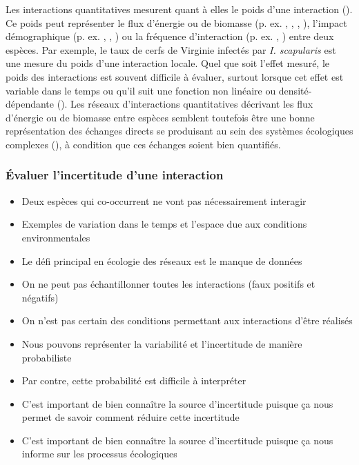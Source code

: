 Les interactions quantitatives mesurent quant à elles le poids d'une interaction
(\cite{Berlow2004Interaction}). Ce poids peut représenter le flux d'énergie ou
de biomasse (p. ex. \cite{Benke2001Food}, \cite{Post2002Long},
\cite{Bersier2002Quantitative}, \cite{Borrett2019Walk}), l'impact démographique
(p. ex. \cite{Paine1992Foodweb}, \cite{Kokkoris2002Variability},
\cite{Emmerson2004Predatorprey}) ou la fréquence d'interaction (p. ex.
\cite{Herrera1989Pollinator}, \cite{Montoya2003Food}) entre deux espèces. Par
exemple, le taux de cerfs de Virginie infectés par \textit{I. scapularis} est
une mesure du poids d'une interaction locale. Quel que soit l'effet mesuré, le
poids des interactions est souvent difficile à évaluer, surtout lorsque cet
effet est variable dans le temps ou qu'il suit une fonction non linéaire ou
densité-dépendante (\cite{Wootton2005Measurement}). Les réseaux d'interactions
quantitatives décrivant les flux d'énergie ou de biomasse entre espèces semblent
toutefois être une bonne représentation des échanges directs se produisant au
sein des systèmes écologiques complexes (\cite{Ladyman2013What}), à condition
que ces échanges soient bien quantifiés. 

\subsubsection{Évaluer l'incertitude d'une interaction} 

\begin{itemize}
    \item Deux espèces qui co-occurrent ne vont pas nécessairement interagir
    \item Exemples de variation dans le temps et l'espace due aux conditions environmentales 
    \item Le défi principal en écologie des réseaux est le manque de données
    \item On ne peut pas échantillonner toutes les interactions (faux positifs et négatifs)
    \item On n'est pas certain des conditions permettant aux interactions d'être réalisés
    \item Nous pouvons représenter la variabilité et l'incertitude de manière probabiliste
    \item Par contre, cette probabilité est difficile à interpréter 
    \item C'est important de bien connaître la source d'incertitude puisque ça nous permet de savoir comment réduire cette incertitude
    \item C'est important de bien connaître la source d'incertitude puisque ça nous informe sur les processus écologiques 
\end{itemize}


